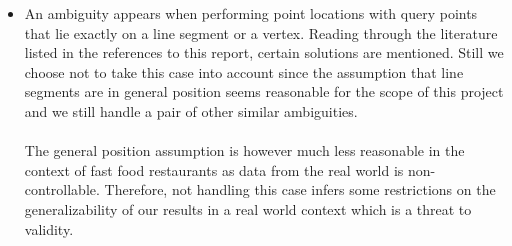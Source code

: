 \begin{itemize}
	\item An ambiguity appears when performing point locations with query points that lie exactly on a line segment or a vertex. Reading through the literature listed in the references to this report, certain solutions are mentioned. Still we choose not to take this case into account since the assumption that line segments are in general position seems reasonable for the scope of this project and we still handle a pair of other similar ambiguities.

\paragraph{}
The general position assumption is however much less reasonable in the context of fast food restaurants as data from the real world is non-controllable. Therefore, not handling this case infers some restrictions on the generalizability of our results in a real world context which is a threat to validity. 

\end{itemize}
        
           